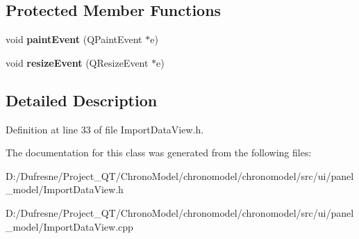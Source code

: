 \subsection*{Protected Member Functions}
\begin{DoxyCompactItemize}
\item 
\hypertarget{class_import_data_view_a75f481fa5c334d5e7ec3b0f62792f900}{void {\bfseries paint\-Event} (Q\-Paint\-Event $\ast$e)}\label{class_import_data_view_a75f481fa5c334d5e7ec3b0f62792f900}

\item 
\hypertarget{class_import_data_view_a01f99a2120c186b311279ebdc9d267ca}{void {\bfseries resize\-Event} (Q\-Resize\-Event $\ast$e)}\label{class_import_data_view_a01f99a2120c186b311279ebdc9d267ca}

\end{DoxyCompactItemize}


\subsection{Detailed Description}


Definition at line 33 of file Import\-Data\-View.\-h.



The documentation for this class was generated from the following files\-:\begin{DoxyCompactItemize}
\item 
D\-:/\-Dufresne/\-Project\-\_\-\-Q\-T/\-Chrono\-Model/chronomodel/chronomodel/src/ui/panel\-\_\-model/Import\-Data\-View.\-h\item 
D\-:/\-Dufresne/\-Project\-\_\-\-Q\-T/\-Chrono\-Model/chronomodel/chronomodel/src/ui/panel\-\_\-model/Import\-Data\-View.\-cpp\end{DoxyCompactItemize}
